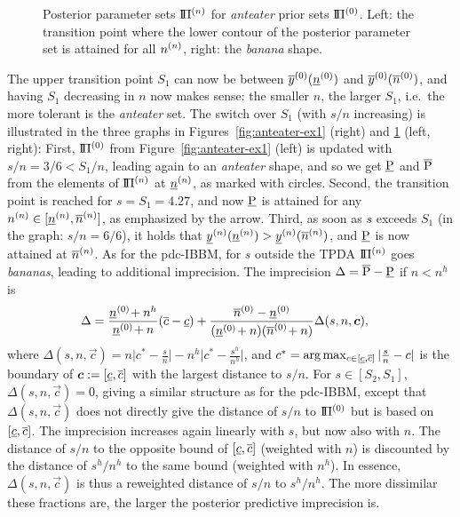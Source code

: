 \begin{figure}[h]
\caption{Posterior parameter sets $\text{I}\!\Pi^{(n)}$ for \emph{anteater} prior sets $\text{I}\!\Pi^{(0)}$.
Left: the transition point where %
the lower contour of the posterior parameter set 
is attained for all $n^{(n)}$, right: the \emph{banana} shape.}
\label{fig:anteater-ex2}
\end{figure}



The upper transition point $S_1$ can now be between $\overline{y}^{(0)}(\underline{n}^{(0)})$ and $\overline{y}^{(0)}(\overline{n}^{(0)})$, and having
$S_1$ decreasing in $n$ now makes sense: the smaller $n$, the larger $S_1$, i.e.\
the more tolerant is the \emph{anteater} set.
The switch over $S_1$ (with $s/n$ increasing)
is illustrated in the three graphs
in Figures~\ref{fig:anteater-ex1} (right) and \ref{fig:anteater-ex2} (left, right):
First, $\text{I}\!\Pi^{(0)}$ from Figure~\ref{fig:anteater-ex1} (left) is updated with
$s/n = 3/6 < S_1/n$, leading again to an \emph{anteater} shape, %
and so we get $\underline{\operatorname{P}}$ and $\overline{\operatorname{P}}$ from the elements of $\text{I}\!\Pi^{(n)}$ at $\underline{n}^{(n)}$, as marked with circles.
Second, the transition point is reached for $s = S_1 = 4.27$,
and now $\underline{\operatorname{P}}$ is attained for any $n^{(n)} \in [\underline{n}^{(n)}, \overline{n}^{(n)}]$, as emphasized by the arrow.
Third, as soon as $s$ exceeds $S_1$ (in the graph: $s/n = 6/6$),
it holds that $\underline{y}^{(n)}(\underline{n}^{(n)}) > \underline{y}^{(n)}(\overline{n}^{(n)})$, and $\underline{\operatorname{P}}$ is now attained at $\overline{n}^{(n)}$.
As for the pdc-IBBM, for $s$ outside the TPDA $\text{I}\!\Pi^{(n)}$ goes \emph{bananas},
leading to additional imprecision.
The imprecision $\Delta = \overline{\operatorname{P}} - \underline{\operatorname{P}}$ if $n < n^h$ is
\begin{align*}
\Delta &= \frac{\underline{n}^{(0)}\! + n^h}{\underline{n}^{(0)}\! + n} (\overline{c} - \underline{c}) + \frac{\overline{n}^{(0)} - \underline{n}^{(0)}}{(\underline{n}^{(0)}\! + n)(\overline{n}^{(0)}\! + n)} \Delta(s, n, {\bm c}),
\end{align*}
where $\Delta(s, n, \vec{c}) = n \big|c^* - \frac{s}{n} \big| - n^h \big| c^* - \frac{s^h}{n^h} \big|$,
and $c^* =  \arg\max_{c \in [\underline{c}, \overline{c}]} |\frac{s}{n} - c|$ is the boundary of ${\bm c} := [\underline{c}, \overline{c}]$ with the largest distance to $s/n$.
For $s \in [S_2, S_1]$, $\Delta(s, n, \vec{c}) = 0$,
giving a similar structure as for the pdc-IBBM, except that
$\Delta(s, n,\vec{c})$ does not directly give the distance of $s/n$ to $\text{I}\!\Pi^{(0)}$ but is based on $[\underline{c}, \overline{c}]$.
The imprecision increases again linearly with $s$,
but now also with $n$. The distance of $s/n$ to the opposite bound of $[\underline{c}, \overline{c}]$
(weighted with $n$) is discounted by the distance of $s^h/n^h$ to the same bound
(weighted with $n^h$). In essence, $\Delta(s, n, \vec{c})$ is thus a reweighted distance of $s/n$ to $s^h/n^h$.
The more dissimilar these fractions are, the larger the posterior predictive imprecision is.

